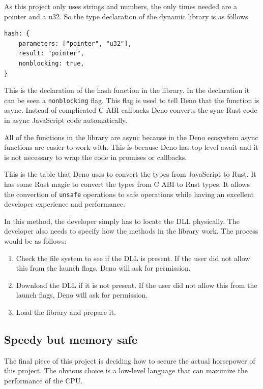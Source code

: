 \documentclass[10pt,journal,compsoc]{IEEEtran}
\begin{document}
As this project only uses strings and numbers, the only times needed are a pointer and a u32. So the type declaration of the dynamic library is as follows.

\begin{lstlisting}
hash: {
    parameters: ["pointer", "u32"],
    result: "pointer",
    nonblocking: true,
}
\end{lstlisting}

This is the declaration of the hash function in the library. In the declaration it can be seen a \verb|nonblocking| flag. This flag is used to tell Deno that the function is async. Instead of complicated C ABI callbacks Deno converts the sync Rust code in async JavaScript code automatically.

All of the functions in the library are async because in the Deno ecosystem async functions are easier to work with. This is because Deno has top level await and it is not necessary to wrap the code in promises or callbacks.

This is the table that Deno uses to convert the types from JavaScript to Rust. It has some Rust magic to convert the types from C ABI to Rust types. It allows the convertion of \verb|unsafe| operations to safe operations while having an excellent developer experience and performance.

In this method, the developer simply has to locate the DLL physically. The developer also needs to specify how the methods in the library work.
The process would be as follows:

\begin{enumerate}
    \item Check the file system to see if the DLL is present. If the user did not allow this from the launch flags, Deno will ask for permission.
    \item Download the DLL if it is not present. If the user did not allow this from the launch flags, Deno will ask for permission.
    \item Load the library and prepare it.
\end{enumerate}


\subsection{Speedy but memory safe}

The final piece of this project is deciding how to secure the actual horsepower of this project. The obvious choice is a low-level language that can maximize the performance of the CPU.
\end{document}
